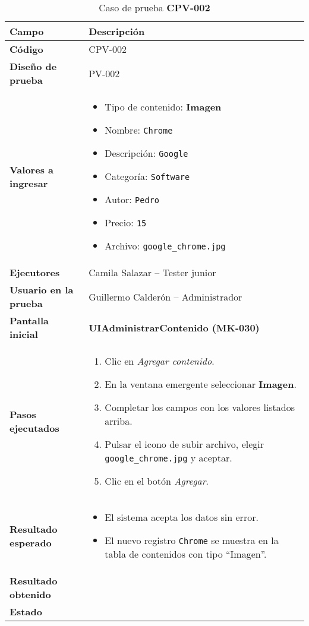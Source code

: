 \begin{table}[H]
\centering
\caption{Caso de prueba \textbf{CPV-002}}
\label{tab:cpv003AgregarContenido}
\begin{tabular}{|p{4cm}|p{10.5cm}|}
\hline
\textbf{Campo} & \textbf{Descripción} \\ \hline
\textbf{Código} & CPV-002 \\ \hline
\textbf{Diseño de prueba} & PV-002 \\ \hline
\textbf{Valores a ingresar} &
\begin{itemize}
  \item Tipo de contenido: \textbf{Imagen}
  \item Nombre: \texttt{Chrome}
  \item Descripción: \texttt{Google}
  \item Categoría: \texttt{Software}
  \item Autor: \texttt{Pedro}
  \item Precio: \texttt{15}
  \item Archivo: \texttt{google\_chrome.jpg}
\end{itemize} \\ \hline
\textbf{Ejecutores} & Camila Salazar – Tester junior \\ \hline
\textbf{Usuario en la prueba} & Guillermo Calderón – Administrador \\ \hline
\textbf{Pantalla inicial} & \textbf{UIAdministrarContenido (MK-030)} \\ \hline
\textbf{Pasos ejecutados} &
\begin{enumerate}
  \item Clic en \textit{Agregar contenido}.
  \item En la ventana emergente seleccionar \textbf{Imagen}.
  \item Completar los campos con los valores listados arriba.
  \item Pulsar el icono de subir archivo, elegir \texttt{google\_chrome.jpg} y aceptar.
  \item Clic en el botón \textit{Agregar}.
\end{enumerate} \\ \hline
\textbf{Resultado esperado} &
\begin{itemize}
  \item El sistema acepta los datos sin error.
  \item El nuevo registro \texttt{Chrome} se muestra en la tabla de contenidos con tipo “Imagen”.
\end{itemize} \\ \hline
\textbf{Resultado obtenido} &  \\ \hline
\textbf{Estado} &  \\ \hline
\end{tabular}
\end{table}